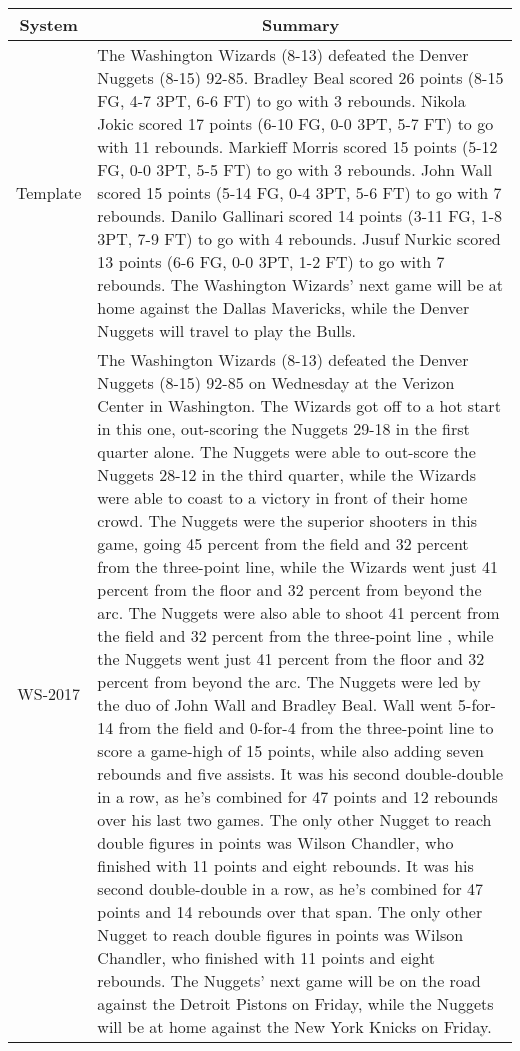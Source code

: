 \documentclass[letterpaper]{article} \usepackage{aaai19}  \usepackage{times}  \usepackage{helvet}  \usepackage{courier}  \usepackage{url}  \usepackage{graphicx}  \frenchspacing  \setlength{\pdfpagewidth}{8.5in}  \setlength{\pdfpageheight}{11in}  \graphicspath{ {images/} }
\begin{document}
\begin{table*}
\small
\centering
\begin{tabular}{|c|p{15.5cm}|}
\hline 
System & \multicolumn{1}{c|}{Summary} \\ 
\hline 
Template & {\color{blue} The Washington Wizards (8-13) defeated the Denver Nuggets (8-15) 92-85. Bradley Beal scored 26 points (8-15 FG, 4-7 3PT, 6-6 FT) to go with 3 rebounds. Nikola Jokic scored 17 points (6-10 FG, 0-0 3PT, 5-7 FT) to go with 11 rebounds. Markieff Morris scored 15 points (5-12 FG, 0-0 3PT, 5-5 FT) to go with 3 rebounds. John Wall scored 15 points (5-14 FG, 0-4 3PT, 5-6 FT) to go with 7 rebounds. Danilo Gallinari scored 14 points (3-11 FG, 1-8 3PT, 7-9 FT) to go with 4 rebounds. Jusuf Nurkic scored 13 points (6-6 FG, 0-0 3PT, 1-2 FT) to go with 7 rebounds.} The Washington Wizards' next game will be at home against the Dallas Mavericks, while the Denver Nuggets will travel to play the Bulls. \\ 
\hline 
WS-2017 & {\color{blue} The Washington Wizards (8-13) defeated the Denver Nuggets (8-15) 92-85} on Wednesday at the Verizon Center in Washington. {\color{red}The Wizards got off to a hot start in this one, out-scoring the Nuggets 29-18 in the first quarter alone. The Nuggets were able to out-score the Nuggets 28-12 in the third quarter}, while the Wizards were able to coast to a victory in front of their home crowd. {\color{red}The Nuggets were the superior shooters in this game, going 45 percent from the field and 32 percent from the three-point line, while the Wizards went just 41 percent from the floor and 32 percent from beyond the arc}. {\color{blue}The Nuggets were also able to shoot 41 percent from the field} {\color{red}and 32 percent from the three-point line }, while the {\color{blue}Nuggets went just 41 percent from the floor} and {\color{red}32 percent from beyond the arc}. {\color{red}The Nuggets were led by the duo of John Wall and Bradley Beal}. {\color{blue}Wall went 5-for-14 from the field and 0-}for{\color{red}-4 }from the three-point line to score a game-{\color{blue}high of 15 points, while also adding seven rebounds and five assists}. It was his second double-double in a row, as he's combined for 47 points and 12 rebounds over his last two games. The only other Nugget to reach double figures in points was Wilson Chandler, {\color{red}who finished with 11 points} and {\color{blue}eight rebounds}. It was his second double-double in a row, as he's combined for 47 points and 14 rebounds over that span. {\color{orange}The only other Nugget to reach double figures in points was Wilson Chandler, {\color{red}who finished with 11 points} and {\color{blue} eight rebounds}}. The Nuggets' next game will be on the road against the Detroit Pistons on Friday, while the Nuggets will be at home against the New York Knicks on Friday. \\ 

\end{tabular}
\end{table*}
\end{document}
